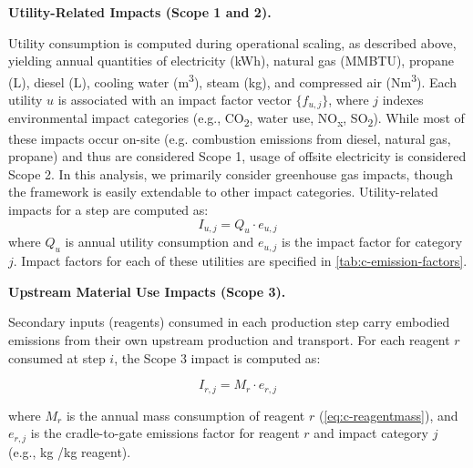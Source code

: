 \medskip
\noindent\textbf{Utility-Related Impacts (Scope 1 and 2).}\quad

Utility consumption is computed during operational scaling, as described above, yielding annual quantities of electricity (kWh), natural gas (MMBTU), propane (L), diesel (L), cooling water (m\textsuperscript{3}), steam (kg), and compressed air (Nm\textsuperscript{3}). Each utility $u$ is associated with an impact factor vector $\{f_{u,j}\}$, where $j$ indexes environmental impact categories (e.g., CO\textsubscript{2}, water use, NO\textsubscript{x}, SO\textsubscript{2}). While most of these impacts occur on-site (e.g. combustion emissions from diesel, natural gas, propane) and thus are considered Scope 1, usage of offsite electricity is considered Scope 2. In this analysis, we primarily consider greenhouse gas impacts, though the framework is easily extendable to other impact categories. Utility-related impacts for a step are computed as:
\begin{equation}
    I_{u,j} = Q_u \cdot e_{u,j}
\end{equation}
where $Q_u$ is annual utility consumption and $e_{u,j}$ is the impact factor for category $j$. Impact factors for each of these utilities are specified in \ref{tab:c-emission-factors}. 

\medskip
\noindent\textbf{Upstream Material Use Impacts (Scope 3).}\quad

Secondary inputs (reagents) consumed in each production step carry embodied emissions from their own upstream production and transport. For each reagent $r$ consumed at step $i$, the Scope 3 impact is computed as:

\begin{equation}
    I_{r,j} = M_r \cdot e_{r,j}
\end{equation}

where $M_r$ is the annual mass consumption of reagent $r$ (\ref{eq:c-reagentmass}), and $e_{r,j}$ is the cradle-to-gate emissions factor for reagent $r$ and impact category $j$ (e.g., kg /kg reagent).

